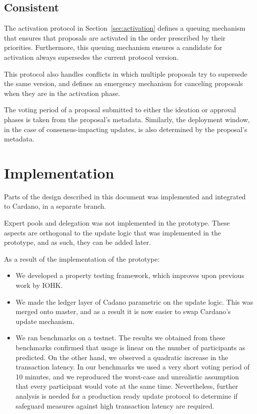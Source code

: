 \documentclass[11pt,a4paper]{article}
\begin{document}
\subsection{Consistent}
\label{sec:sat-cons-update-logic}

The activation protocol in Section~\ref{sec:activation} defines a queuing
mechanism that ensures that proposals are activated in the order prescribed by
their priorities. Furthermore, this queuing mechanism ensures a candidate
for activation always supersedes the current protocol version.

This protocol also handles conflicts in which multiple proposals try to
supersede the same version, and defines an emergency mechanism for canceling
proposals when they are in the activation phase.

The voting period of a proposal submitted to either the ideation or approval
phases is taken from the proposal's metadata.
Similarly, the deployment window, in the case of consensus-impacting updates, is
also determined by the proposal's metadata.

\section{Implementation}
\label{sec:implementation-1}

Parts of the design described in this document was implemented and integrated to Cardano,
in a separate branch.

Expert pools and delegation was not implemented in the prototype. These aspects
are orthogonal to the update logic that was implemented in the prototype, and as
such, they can be added later.

As a result of the implementation of the prototype:
\begin{itemize}
\item We developed a property testing framework, which improves upon previous
  work by IOHK.
\item We made the ledger layer of Cadano parametric on the update logic. This
  was merged onto master, and as a result it is now easier to swap Cardano's
  update mechanism.
\item We ran benchmarks on a testnet. The results we obtained from these
  benchmarks confirmed that usage is linear on the number of participants as
  predicted. On the other hand, we observed a quadratic increase in the
  transaction latency. In our benchmarks we used a very short voting period of
  10 minutes, and we reproduced the worst-case and unrealistic assumption that
  every participant would vote at the same time. Nevertheless, further analysis
  is needed for a production ready update protocol to determine if safeguard
  measures against high transaction latency are required.
\end{itemize}
\end{document}
